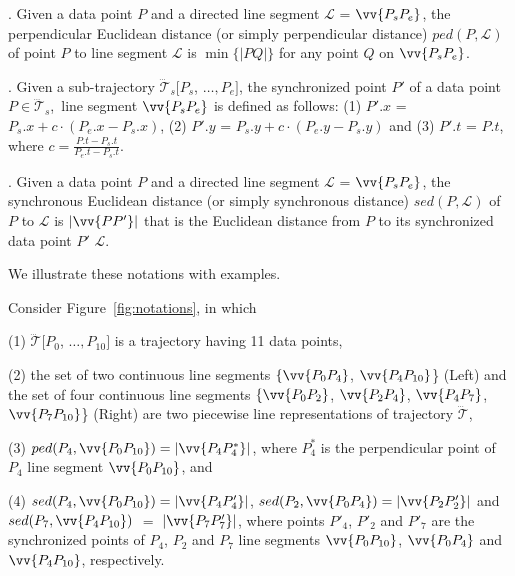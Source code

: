 . Given a data point $P$ and a directed line segment $\mathcal{L}$ = $\vv{P_{s}P_{e}}$, the perpendicular Euclidean distance (or simply perpendicular distance) $ped(P, \mathcal{L})$ of point $P$ to line segment $\mathcal{L}$ is $\min\{|PQ|\}$ for any point $Q$ on $\vv{P_{s}P_{e}}$.

. Given a sub-trajectory $\dddot{\mathcal{T}}_s[P_s$, $\ldots, P_e]$, the synchronized point $P'$ of a data point  $P \in \dddot{\mathcal{T}}_s$,~\wrt line segment $\vv{P_sP_e}$ is defined as follows:
(1) $P'.x$ = $P_s.x +  c\cdot(P_e.x - P_s.x)$,
(2) $P'.y$ = $P_s.y +  c\cdot(P_e.y - P_s.y)$ and
(3) $P'.t$ = $P.t$, where $c= \frac{P.t-P_s.t}{P_e.t-P_s.t}$.

. Given a data point $P$ and a directed line segment $\mathcal{L}$ = $\vv{P_{s}P_{e}}$, the synchronous Euclidean distance (or simply synchronous distance) $sed(P, \mathcal{L})$ of $P$ to $\mathcal{L}$ is $|\vv{PP'}|$ that is the Euclidean distance from $P$ to its synchronized data point $P'$ \wrt $\mathcal{L}$. %

We illustrate these notations with examples.


\begin{example}
	\label{exm-notations}
	Consider Figure~\ref{fig:notations}, in which
	
	\sstab(1) $\dddot{\mathcal{T}}[P_0$, $\ldots, P_{10}]$ is a trajectory having 11 data points,
	
	\sstab (2) the set of two continuous line segments $\{\vv{P_0P_4}$, $\vv{P_4P_{10}}$\} (Left) and the set of four continuous line segments $\{\vv{P_0P_2}$, $\vv{P_2P_4}$, $\vv{P_4P_7}$, $\vv{P_7P_{10}}$\} (Right) are two piecewise line representations of trajectory $\dddot{\mathcal{T}}$,
	
	\sstab(3) $ped(P_4, \vv{P_0P_{10}})=|\vv{P_4P^*_4}|$, where $P^*_4$ is the perpendicular point of $P_4$ \wrt line segment $\vv{P_0P_{10}}$, and
	
	\sstab (4) $sed(P_4, \vv{P_0P_{10}})= |\vv{P_4P'_4}|$, $sed(P_2, \vv{P_0P_{4}})= |\vv{P_2P'_2}|$ and $sed(P_7, \vv{P_4P_{10}})$ $=$ $|\vv{P_7P'_7}|$,
	where points $P'_4$, $P'_2$ and $P'_7$ are the synchronized points of $P_4$, $P_2$ and $P_7$ \wrt line segments $\vv{P_0P_{10}}$, $\vv{P_0P_{4}}$ and $\vv{P_4P_{10}}$, respectively.
\end{example}


